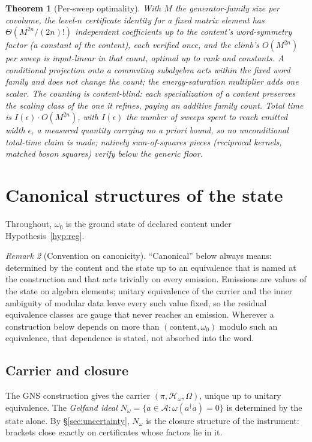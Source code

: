 \documentclass[11pt]{article}
\newtheorem{theorem}{Theorem}[section]
\theoremstyle{definition}
\theoremstyle{remark}
\newtheorem{remark}[theorem]{Remark}
\newcommand{\A}{\mathcal{A}}
\newcommand{\w}{\omega_0}
\newcommand{\Hw}{\mathcal{H}_{\omega}}
\begin{document}
\begin{theorem}[Per-sweep optimality]\label{thm:persweep}
With $M$ the generator-family size per covolume, the level-$n$ certificate
identity for a fixed matrix element has $\Theta(M^{2n}/(2n)!)$
independent coefficients up to the content's word-symmetry factor (a
constant of the content), each verified once, and the climb's $O(M^{2n})$
per sweep is input-linear in that count, optimal up to rank and constants.
A conditional projection onto a commuting subalgebra acts within the fixed
word family and does not change the count; the energy-saturation multiplier
adds one scalar.  The counting is content-blind: each specialization of a
content preserves the scaling class of the one it refines, paying an
additive family count.  Total time is $I(\epsilon)\cdot O(M^{2n})$, with
$I(\epsilon)$ the number of sweeps spent to reach emitted width
$\epsilon$, a measured quantity carrying no a priori bound, so no
unconditional total-time claim is made; natively sum-of-squares pieces
(reciprocal kernels, matched boson squares) verify below the generic
floor.
\end{theorem}

\section{Canonical structures of the state}\label{sec:canonical}

Throughout, $\w$ is the ground state of declared content under
Hypothesis~\ref{hyp:reg}.

\begin{remark}[Convention on canonicity]\label{rem:convention}
``Canonical'' below always means: determined by the content and the
state up to an equivalence that is named at the construction and that
acts trivially on every emission.  Emissions are values of the state on
algebra elements; unitary equivalence of the carrier and the inner
ambiguity of modular data leave every such value fixed, so the residual
equivalence classes are gauge that never reaches an emission.  Wherever
a construction below depends on more than $(\text{content}, \w)$ modulo
such an equivalence, that dependence is stated, not absorbed into the
word.
\end{remark}

\subsection{Carrier and closure}
The GNS construction gives the carrier $(\pi, \Hw, \Omega)$, unique up to
unitary equivalence.  The \emph{Gelfand ideal} $N_\omega = \{a \in \A :
\omega(a^\dagger a) = 0\}$ is determined by the state alone.  By
\S\ref{sec:uncertainty}, $N_\omega$ is the closure structure of the
instrument: brackets close exactly on certificates whose factors lie in
it.
\end{document}
